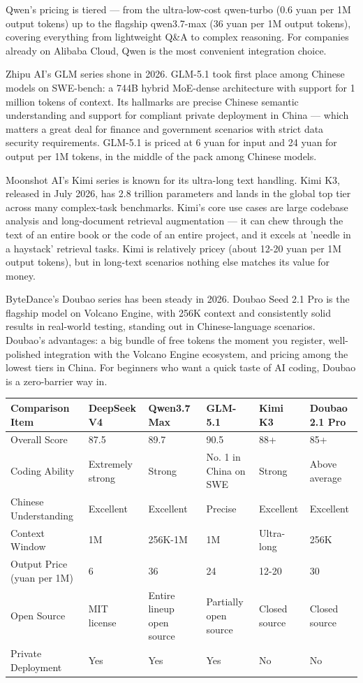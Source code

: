 Qwen's pricing is tiered — from the ultra-low-cost qwen-turbo (0.6 yuan per 1M output tokens) up to the flagship qwen3.7-max (36 yuan per 1M output tokens), covering everything from lightweight Q\&A to complex reasoning. For companies already on Alibaba Cloud, Qwen is the most convenient integration choice.


Zhipu AI's GLM series shone in 2026. GLM-5.1 took first place among Chinese models on SWE-bench: a 744B hybrid MoE-dense architecture with support for 1 million tokens of context. Its hallmarks are precise Chinese semantic understanding and support for compliant private deployment in China — which matters a great deal for finance and government scenarios with strict data security requirements. GLM-5.1 is priced at 6 yuan for input and 24 yuan for output per 1M tokens, in the middle of the pack among Chinese models.


Moonshot AI's Kimi series is known for its ultra-long text handling. Kimi K3, released in July 2026, has 2.8 trillion parameters and lands in the global top tier across many complex-task benchmarks. Kimi's core use cases are large codebase analysis and long-document retrieval augmentation — it can chew through the text of an entire book or the code of an entire project, and it excels at 'needle in a haystack' retrieval tasks. Kimi is relatively pricey (about 12-20 yuan per 1M output tokens), but in long-text scenarios nothing else matches its value for money.


ByteDance's Doubao series has been steady in 2026. Doubao Seed 2.1 Pro is the flagship model on Volcano Engine, with 256K context and consistently solid results in real-world testing, standing out in Chinese-language scenarios. Doubao's advantages: a big bundle of free tokens the moment you register, well-polished integration with the Volcano Engine ecosystem, and pricing among the lowest tiers in China. For beginners who want a quick taste of AI coding, Doubao is a zero-barrier way in.

\begin{center}
\begin{tabularx}{\linewidth}{|X|X|X|X|X|X|}
\hline
\textbf{Comparison Item} & \textbf{DeepSeek V4} & \textbf{Qwen3.7 Max} & \textbf{GLM-5.1} & \textbf{Kimi K3} & \textbf{Doubao 2.1 Pro} \tabularnewline
\hline
Overall Score & 87.5 & 89.7 & 90.5 & 88+ & 85+ \tabularnewline
Coding Ability & Extremely strong & Strong & No. 1 in China on SWE & Strong & Above average \tabularnewline
Chinese Understanding & Excellent & Excellent & Precise & Excellent & Excellent \tabularnewline
Context Window & 1M & 256K-1M & 1M & Ultra-long & 256K \tabularnewline
Output Price (yuan per 1M) & 6 & 36 & 24 & 12-20 & 30 \tabularnewline
Open Source & MIT license & Entire lineup open source & Partially open source & Closed source & Closed source \tabularnewline
Private Deployment & Yes & Yes & Yes & No & No \tabularnewline
\hline
\end{tabularx}
\end{center}

